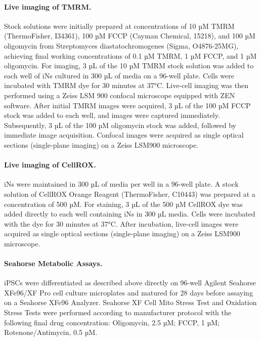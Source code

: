 \paragraph{Live imaging of TMRM.}
Stock solutions were initially prepared at concentrations of 10 µM TMRM (ThermoFisher, I34361), 100 µM FCCP (Cayman Chemical, 15218), and 100 µM oligomycin from Streptomyces diastatochromogenes (Sigma, O4876-25MG), achieving final working concentrations of 0.1 µM TMRM, 1 µM FCCP, and 1 µM oligomycin. For imaging, 3 µL of the 10 µM TMRM stock solution was added to each well of iNs cultured in 300 µL of media on a 96-well plate. Cells were incubated with TMRM dye for 30 minutes at 37°C. Live-cell imaging was then performed using a Zeiss LSM 900 confocal microscope equipped with ZEN software. After initial TMRM images were acquired, 3 µL of the 100 µM FCCP stock was added to each well, and images were captured immediately. Subsequently, 3 µL of the 100 µM oligomycin stock was added, followed by immediate image acquisition. Confocal images were acquired as single optical sections (single-plane imaging) on a Zeiss LSM900 microscope.

\paragraph{Live imaging of CellROX.}
iNs were maintained in 300 µL of media per well in a 96-well plate. A stock solution of CellROX Orange Reagent (ThermoFisher, C10443) was prepared at a concentration of 500 µM. For staining, 3 µL of the 500 µM CellROX dye was added directly to each well containing iNs in 300 µL media. Cells were incubated with the dye for 30 minutes at 37°C. After incubation, live-cell images were acquired as single optical sections (single-plane imaging) on a Zeiss LSM900 microscope.

\paragraph{Seahorse Metabolic Assays.}
iPSCs were differentiated as described above directly on 96-well Agilent Seahorse XFe96/XF Pro cell culture microplates and matured for 28 days before assaying on a Seahorse XFe96 Analyzer. Seahorse XF Cell Mito Stress Test and Oxidation Stress Tests were performed according to manufacturer protocol with the following final drug concentration: Oligomycin, 2.5 µM; FCCP, 1 µM; Rotenone/Antimycin, 0.5 µM. 

